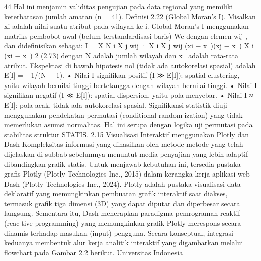 44
Hal ini menjamin validitas pengujian pada data regional yang memiliki keterbatasan jumlah
amatan (n = 41).
Definisi 2.22 (Global Moran’s I). Misalkan xi adalah nilai suatu atribut pada wilayah ke-i.
Global Moran’s I menggunakan matriks pembobot awal (belum terstandardisasi baris)
Wc dengan elemen wij , dan didefinisikan sebagai:
I = X
N
i
X
j
wij
·
X
i
X
j
wij (xi − x¯)(xj − x¯)
X
i
(xi − x¯)
2
(2.73)
dengan N adalah jumlah wilayah dan x¯ adalah rata-rata atribut. Ekspektasi di bawah
hipotesis nol (tidak ada autokorelasi spasial) adalah E[I] = −1/(N − 1).
• Nilai I signifikan positif (I ≫ E[I]): spatial clustering, yaitu wilayah bernilai tinggi
bertetangga dengan wilayah bernilai tinggi.
• Nilai I signifikan negatif (I ≪ E[I]): spatial dispersion, yaitu pola menyebar.
• Nilai I ≈ E[I]: pola acak, tidak ada autokorelasi spasial.
Signifikansi statistik diuji menggunakan pendekatan permutasi (conditional randomization) yang tidak memerlukan asumsi normalitas. Hal ini serupa dengan logika uji
permutasi pada stabilitas struktur STATIS.
2.15 Visualisasi Interaktif menggunakan Plotly dan Dash
Kompleksitas informasi yang dihasilkan oleh metode-metode yang telah dijelaskan
di subbab sebelumnya menuntut media penyajian yang lebih adaptif dibandingkan grafik
statis. Untuk menjawab kebutuhan ini, tersedia pustaka grafis Plotly (Plotly Technologies
Inc., 2015) dalam kerangka kerja aplikasi web Dash (Plotly Technologies Inc., 2024).
Plotly adalah pustaka visualisasi data deklaratif yang memungkinkan pembuatan grafik
interaktif saat diakses, termasuk grafik tiga dimensi (3D) yang dapat diputar dan diperbesar
secara langsung. Sementara itu, Dash menerapkan paradigma pemrograman reaktif (reactive programming) yang memungkinkan grafik Plotly merespons secara dinamis terhadap
masukan (input) pengguna. Secara konseptual, integrasi keduanya membentuk alur kerja
analitik interaktif yang digambarkan melalui flowchart pada Gambar 2.2 berikut.
Universitas Indonesia

